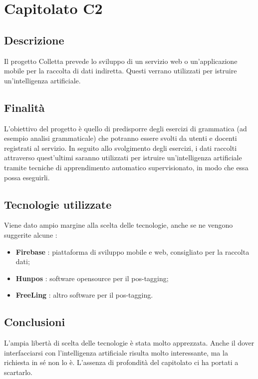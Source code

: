\section{Capitolato C2}
	\subsection{Descrizione}
		Il progetto Colletta prevede lo sviluppo di un servizio web o un'applicazione mobile per la raccolta di dati indiretta. Questi verrano utilizzati per istruire un'intelligenza artificiale.
	\subsection{Finalità}
		L'obiettivo del progetto è quello di predisporre degli esercizi di grammatica (ad esempio analisi grammaticale) che potranno essere svolti da utenti e docenti registrati al servizio.
		In seguito allo svolgimento degli esercizi, i dati raccolti attraverso quest'ultimi saranno utilizzati per istruire un'intelligenza artificiale tramite tecniche di apprendimento automatico supervisionato, in modo che essa possa eseguirli.
	\subsection{Tecnologie utilizzate}
		Viene dato ampio margine alla scelta delle tecnologie, anche se ne vengono suggerite alcune :
		\begin{itemize}
			\item \textbf{Firebase} : piattaforma di sviluppo mobile e web, consigliato per la raccolta dati;
			\item \textbf{Hunpos} : software opensource per il pos-tagging;
			\item \textbf{FreeLing} : altro software per il pos-tagging.
		\end{itemize} 
	\subsection{Conclusioni}
		L'ampia libertà di scelta delle tecnologie è stata molto apprezzata. Anche il dover interfacciarsi con l'intelligenza artificiale risulta molto interessante, ma la richiesta in sé non lo è. L'assenza di profondità del capitolato ci ha portati a scartarlo.